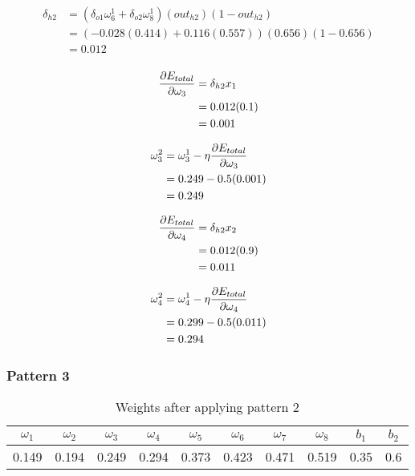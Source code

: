 \documentclass[10pt,a4paper]{article}
\begin{document}
\begin{equation}
\begin{split}
\delta_{h2} &= (\delta_{o1}\omega_6^1 + \delta_{o2}\omega_8^1)(out_{h2})(1-out_{h2})\\
&= (-0.028(0.414) + 0.116(0.557))(0.656)(1-0.656)\\
&= 0.012\\
\end{split}
\end{equation}

\begin{equation}
\begin{split}
\pdv{E_{total}}{\omega_3} &= \delta_{h2}x_1\\ 
                          &= 0.012(0.1)\\
                          &= 0.001\\
\end{split}
\end{equation}

\begin{equation}
\begin{split}
\omega_3^2 &= \omega_3^1 - \eta\pdv{E_{total}}{\omega_3}\\
           &= 0.249 -0.5(0.001)\\
           &= 0.249\\
\end{split}
\end{equation}

\begin{equation}
\begin{split}
\pdv{E_{total}}{\omega_4} &= \delta_{h2}x_2\\ 
                          &= 0.012(0.9)\\
                          &= 0.011\\
\end{split}
\end{equation}

\begin{equation}
\begin{split}
\omega_4^2 &= \omega_4^1 - \eta\pdv{E_{total}}{\omega_4}\\
           &= 0.299 -0.5(0.011)\\
           &= 0.294\\
\end{split}
\end{equation}

\subsubsection{Pattern 3}
\begin{table}
\begin{tabular}{|c|c|c|c|c|c|c|c|c|c|}
\hline
$\omega_1$ & $\omega_2$ & $\omega_3$ & $\omega_4$ & $\omega_5$ & $\omega_6$ & $\omega_7$ & $\omega_8$ & $b_1$ & $b_2$\\
\hline
0.149 &0.194 &0.249 & 0.294 & 0.373 & 0.423 & 0.471 & 0.519 & 0.35 & 0.6 \\
\hline
\end{tabular}
\caption{Weights after applying pattern 2}\label{tablep3}
\end{table}
\end{document}

